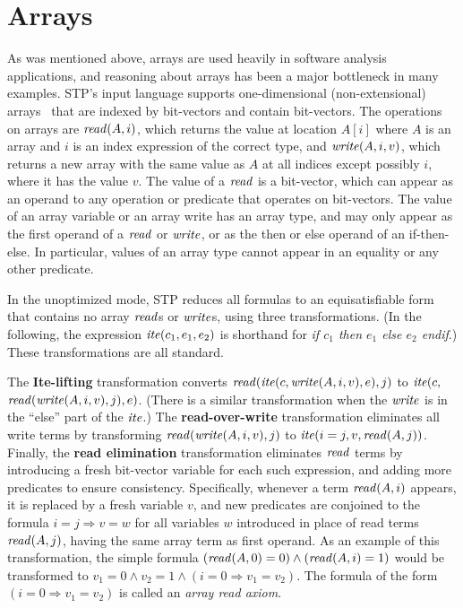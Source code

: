 \section{Arrays}
As was mentioned above, arrays are used heavily in software analysis
applications, and reasoning about arrays has been a major bottleneck
in many examples. STP's input language supports one-dimensional
(non-extensional) arrays~\cite{stumparray} that are indexed by
bit-vectors and contain bit-vectors.  The operations on arrays are
${\it read}(A, i)$, which returns the value at location $A[i]$ where $A$
is an array and $i$ is an index expression of the correct type, and
${\it write}(A, i, v)$, which returns a new array with the same value as
$A$ at all indices except possibly $i$, where it has the value $v$.
The value of a ${\it read}$ is a bit-vector, which can appear as an
operand to any operation or predicate that operates on bit-vectors.
The value of an array variable or an array write has an array type,
and may only appear as the first operand of a ${\it read}$ or
${\it write}$, or as the then or else operand of an if-then-else.  In
particular, values of an array type cannot appear in an equality or
any other predicate.

In the unoptimized mode, STP reduces all formulas to an
equisatisfiable form that contains no array ${\it read}$s or
${\it write}$s, using three transformations.  (In the following, the
expression ${\it ite}(c_1,e_1,e_2)$ is shorthand for {\it if $c_1$ then
$e_1$ else $e_2$ endif}.)  These transformations are all standard.

The {\bf Ite-lifting\/} transformation converts
${\it read}({\it ite}(c, {\it write}(A, i, v), e), j)$ to
${\it ite}(c,$ ${\it read}({\it write}(A, i, v), j), e)$.  
(There is
a similar transformation when the ${\it write}$ is in the ``else'' part
of the ${\it ite}$.)  The {\bf read-over-write} transformation
eliminates all write terms by transforming 
${\it read}({\it write}(A, i, v), j)$ to ${\it ite}(i=j, v, {\it read}(A, j))$.  
Finally, the {\bf read
elimination} transformation eliminates ${\it read}$ terms by introducing
a fresh bit-vector variable for each such expression, and adding
more predicates to ensure consistency.  Specifically, whenever a
term ${\it read}(A, i)$ appears, it is replaced by a fresh variable $v$,
and new predicates are conjoined to the formula $i = j \Rightarrow v =
w$ for all variables $w$ introduced in place of read terms
${\it read}(A, j)$, having the same array term as first operand. As an
example of this transformation, the simple formula $({\it read}(A, 0) =
0) \wedge ({\it read}(A, i) = 1)$ would be transformed to
$v_1 = 0 \wedge v_2 = 1 \wedge (i = 0 \Rightarrow v_1 = v_2)$.
The formula of the form $(i = 0 \Rightarrow v_1 = v_2)$ is 
called an {\it array read axiom}.

